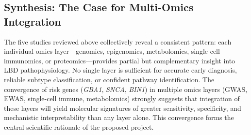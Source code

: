 \subsection{Synthesis: The Case for Multi-Omics Integration}
The five studies reviewed above collectively reveal a consistent pattern: each individual omics layer---genomics, epigenomics, metabolomics, single-cell immunomics, or proteomics---provides partial but complementary insight into LBD pathophysiology. No single layer is sufficient for accurate early diagnosis, reliable subtype classification, or confident pathway identification. The convergence of risk genes (\textit{GBA1}, \textit{SNCA}, \textit{BIN1}) in multiple omics layers (GWAS, EWAS, single-cell immune, metabolomics) strongly suggests that integration of these layers will yield molecular signatures of greater sensitivity, specificity, and mechanistic interpretability than any layer alone. This convergence forms the central scientific rationale of the proposed project.
